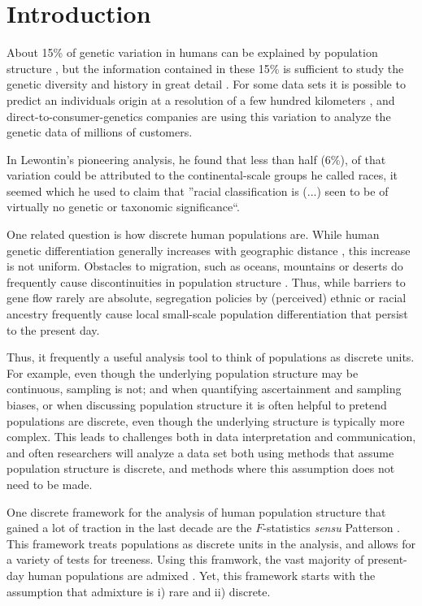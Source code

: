 \documentclass[12pt,a4pape, fullpage]{article}
\begin{document}
\section{Introduction}
About 15\% of genetic variation in humans can be explained by population structure \cite{lewontin1972, barbujani1997, rosenberg2003}, but the information contained in these 15\% is sufficient to study the genetic diversity and history in great detail \cite{edwards2003}. For some data sets it is possible to predict an individuals origin at a resolution of a few hundred kilometers \cite{novembre2008, leslie2015}, and direct-to-consumer-genetics companies are using this variation to analyze the genetic data of millions of customers.

In Lewontin's pioneering analysis, he found that less than half (6\%), of that variation could be attributed to the continental-scale groups he called races, it seemed  which he used to claim that ''racial classification is (...) seen to be of virtually no genetic or taxonomic significance``.

One related question is how discrete human populations are. While human genetic differentiation generally increases with geographic distance \cite{ramachandran2005, rosenberg2007}, this increase is not uniform. Obstacles to migration,  such as oceans, mountains or deserts do frequently cause discontinuities in population structure \cite{peter2020a}. Thus, while barriers to gene flow rarely are absolute, segregation policies by (perceived) ethnic or racial ancestry frequently cause local small-scale population differentiation that persist to the present day.

Thus, it frequently a useful analysis tool to think of populations as discrete units. For example, even though the underlying population structure may be continuous, sampling is not; and when quantifying ascertainment and sampling biases, or when discussing population structure it is often helpful to pretend populations are discrete, even though the underlying structure is typically more complex. This leads to challenges both in data interpretation and communication, and often researchers will analyze a data set both using methods that assume population structure is discrete, and methods where this assumption does not need to be made.

One discrete framework for the analysis of human population structure that gained a lot of traction in the last decade are the $F$-statistics \textit{sensu} Patterson \cite{patterson2012, peter2016}. This framework treats populations as discrete units in the analysis, and allows for a variety of tests for treeness. Using this framwork, the vast majority of present-day human populations are admixed \cite{pickrell2014}. Yet, this framework starts with the assumption that admixture is i) rare and ii) discrete.
\end{document}
